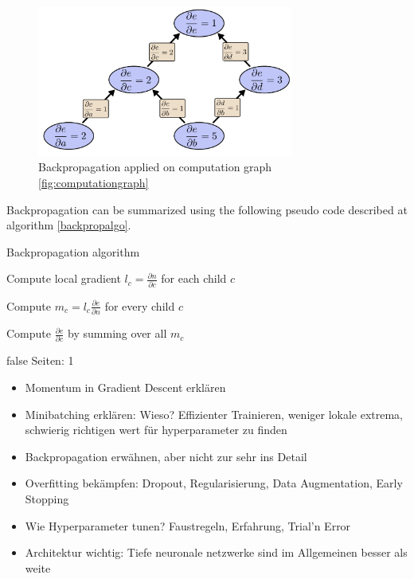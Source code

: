 \documentclass[draft,final,oneside]{vutinfth} %
\begin{document}
\begin{figure}[ht]
	\centering
  	\includegraphics[width=0.75\textwidth]{graphics/computationgraphreverse.png}
	\caption{Backpropagation applied on computation graph \ref{fig:computationgraph} \cite{colahbackprop}}
	\label{fig:computationgraphreverse}
\end{figure}

Backpropagation can be summarized using the following pseudo code described at algorithm \ref{backpropalgo}.

\begin{algorithm}
\caption{Backpropagation algorithm \cite{dlvc}}

 {

Compute local gradient $l_c = \frac{\partial n}{\partial c}$ for each child $c$

Compute $m_c = l_c  \frac{\partial e}{\partial n}$ for every child $c$

Compute $\frac{\partial e}{\partial c}$ by summing over all $m_c$

}
\label{backpropalgo}
\end{algorithm}

\if false
Seiten: 1
\begin{itemize}

\item Momentum in Gradient Descent erklären
\item Minibatching erklären: Wieso? Effizienter Trainieren, weniger lokale extrema, schwierig richtigen wert für hyperparameter zu finden
\item Backpropagation erwähnen, aber nicht zur sehr ins Detail
\item Overfitting bekämpfen: Dropout, Regularisierung, Data Augmentation, Early Stopping
\item Wie Hyperparameter tunen? Faustregeln, Erfahrung, Trial'n Error
\item Architektur wichtig: Tiefe neuronale netzwerke sind im Allgemeinen besser als weite

\end{itemize}
\fi
\end{document}
